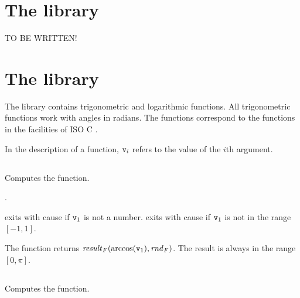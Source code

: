 \section{The  library}

TO BE WRITTEN!

\section{The  library}

The library contains trigonometric and logarithmic functions.
All trigonometric functions work with angles in radians.
The functions correspond to the functions in the  facilities of ISO C
\cite{harbison+steele:c,iso-c}.

In the description of a function, ${\tt{\sl v}}_i$ refers to the value of the $i$th argument.


\subsection{}

\label{section:math:acos1}

Computes the  function.

\TYPE

.

\EXITS

 exits with cause  if ${\tt{\sl v}}_1$ is not a number.
 exits with cause  if ${\tt{\sl v}}_1$ is not in the range $[-1,1]$.

\EVALUATION

The function returns $\mathit{result}_F(\arccos({\tt{\sl v}}_1),\mathit{rnd}_F)$.
The result is always in the range $[0,\pi]$.


\iffalse
\subsection{}

\label{section:math:acosh1}

Computes the  function.

